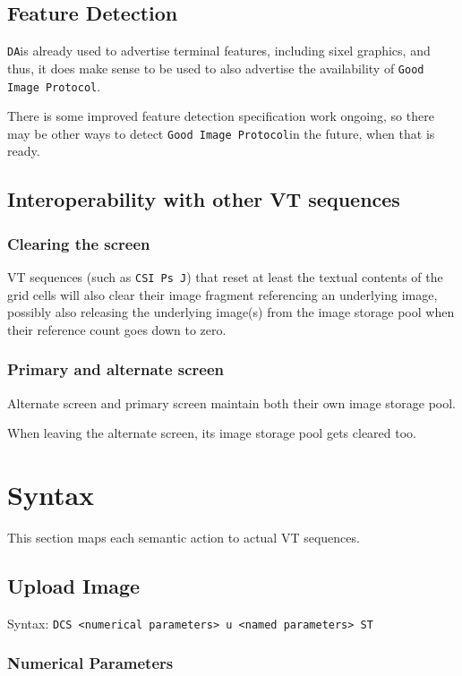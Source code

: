 \documentclass{article}
\newcommand{\code}[1]{\colorbox{light-gray}{\texttt{#1}}}
\newcommand{\DA}{\code{DA}}
\newcommand{\GoodImageProtocol}{\code{Good Image Protocol}}
\begin{document}
\subsection{Feature Detection}

\DA is already used to advertise terminal features, including sixel graphics, and thus,
it does make sense to be used to also advertise the availability of \GoodImageProtocol.

There is some improved feature detection specification work ongoing,
so there may be other ways to detect \GoodImageProtocol in the future, when that is ready.

\subsection{Interoperability with other VT sequences}

\subsubsection*{Clearing the screen}

VT sequences (such as \code{CSI Ps J}) that reset at least the textual contents of the grid cells will also
clear their image fragment referencing an underlying image, possibly also releasing the
underlying image(s) from the image storage pool when their reference count goes down to zero.

\subsubsection*{Primary and alternate screen}

Alternate screen and primary screen maintain both their own image storage pool.

When leaving the alternate screen, its image storage pool gets cleared too.
\section{Syntax} %

This section maps each semantic action to actual VT sequences.

\subsection{Upload Image}

Syntax: \code{DCS <numerical parameters> u <named parameters> ST}

\subsubsection*{Numerical Parameters}
\end{document}

